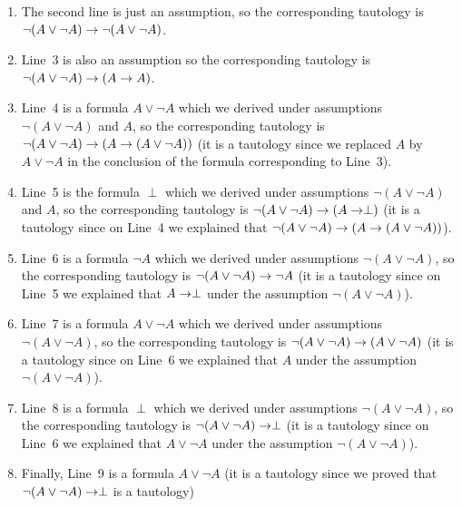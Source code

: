 \begin{enumerate}
  \item The second line is just an assumption, so the corresponding tautology is
    $\lnot (A \lor \lnot A) \rightarrow \lnot (A \lor \lnot A)$.
  \item Line~3 is also an assumption so the corresponding tautology is
    $\lnot (A \lor \lnot A) \rightarrow (A \rightarrow A)$.
  \item Line~4 is a formula $A \lor \lnot A$ which we derived under assumptions
    $\lnot (A \lor \lnot A)$ and $A$, so the corresponding tautology is
    $\lnot (A \lor \lnot A) \rightarrow (A \rightarrow (A \lor \lnot A))$ (it is a
    tautology since we replaced $A$ by $A \lor \lnot A$ in the conclusion of
    the formula corresponding to Line~3).
  \item Line~5 is the formula $\perp$ which we derived under assumptions
    $\lnot (A \lor \lnot A)$ and $A$, so the corresponding tautology is
    $\lnot (A \lor \lnot A) \rightarrow (A \rightarrow \perp)$ (it is a
    tautology since on Line~4 we explained that $\lnot (A \lor \lnot A)
    \rightarrow (A \rightarrow (A \lor \lnot A))$).
  \item Line~6 is a formula $\lnot A$ which we derived under assumptions
    $\lnot (A \lor \lnot A)$, so the corresponding tautology is
    $\lnot (A \lor \lnot A) \rightarrow \lnot A$ (it is a
    tautology since on Line~5 we explained that $A \rightarrow \perp$ under the
    assumption $\lnot (A \lor \lnot A)$).
  \item Line~7 is a formula $A \lor \lnot A$ which we derived under assumptions
    $\lnot (A \lor \lnot A)$, so the corresponding tautology is
    $\lnot (A \lor \lnot A) \rightarrow (A \lor \lnot A)$ (it is a
    tautology since on Line~6 we explained that $A$ under the
    assumption $\lnot (A \lor \lnot A)$).
  \item Line~8 is a formula $\perp$ which we derived under assumptions
    $\lnot (A \lor \lnot A)$, so the corresponding tautology is
    $\lnot (A \lor \lnot A) \rightarrow \perp$ (it is a
    tautology since on Line~6 we explained that $A \lor \lnot A$ under the
    assumption $\lnot (A \lor \lnot A)$).
  \item Finally, Line~9 is a formula $A \lor \lnot A$ (it is a tautology since
    we proved that $\lnot (A \lor \lnot A) \rightarrow \perp$ is a tautology)
\end{enumerate}



